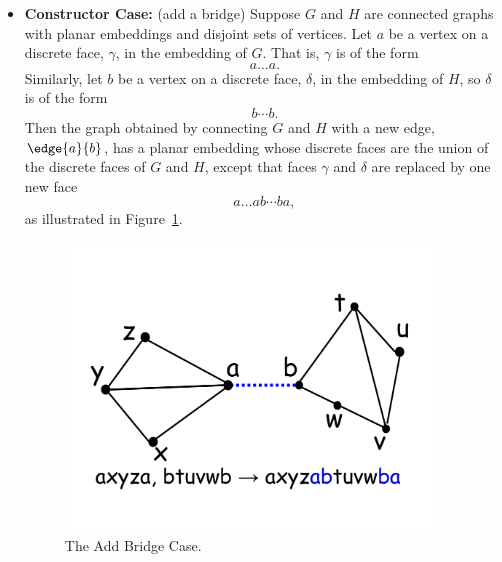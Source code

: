 \documentclass[handout]{mcs}
\begin{document}
\begin{itemize}
\item \textbf{Constructor Case:} (add a bridge) Suppose $G$ and $H$ are
connected graphs with planar embeddings and disjoint sets of vertices.
Let $a$ be a vertex on a discrete face, $\gamma$, in the embedding of
$G$.  That is, $\gamma$ is of the form
\[
a\dots a.
\]
Similarly, let $b$ be a vertex on a discrete face, $\delta$, in the
embedding of $H$, so $\delta$ is of the form
\[
b\cdots b.
\]
Then the graph obtained by connecting $G$ and $H$ with a new edge,
$\edge{a}{b}$, has a planar embedding whose discrete faces are the union of
the discrete faces of $G$ and $H$, except that faces $\gamma$ and $\delta$
are replaced by one new face
\[
a\dots ab\cdots ba,
\]
as illustrated in Figure~\ref{cp7f.fig:add-bridge}.

\begin{figure}[h]
\centering \includegraphics[height=3in]{figures/add-bridge}
\caption{The Add Bridge Case.}
\label{cp7f.fig:add-bridge}
\end{figure}

\end{itemize}


\end{document}
